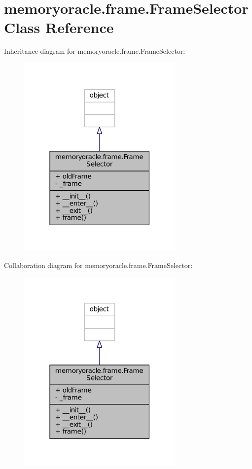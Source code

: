 \hypertarget{classmemoryoracle_1_1frame_1_1FrameSelector}{}\section{memoryoracle.\+frame.\+Frame\+Selector Class Reference}
\label{classmemoryoracle_1_1frame_1_1FrameSelector}


Inheritance diagram for memoryoracle.\+frame.\+Frame\+Selector\+:\nopagebreak
\begin{figure}[H]
\begin{center}
\leavevmode
\includegraphics[width=231pt]{classmemoryoracle_1_1frame_1_1FrameSelector__inherit__graph}
\end{center}
\end{figure}


Collaboration diagram for memoryoracle.\+frame.\+Frame\+Selector\+:\nopagebreak
\begin{figure}[H]
\begin{center}
\leavevmode
\includegraphics[width=231pt]{classmemoryoracle_1_1frame_1_1FrameSelector__coll__graph}
\end{center}
\end{figure}
